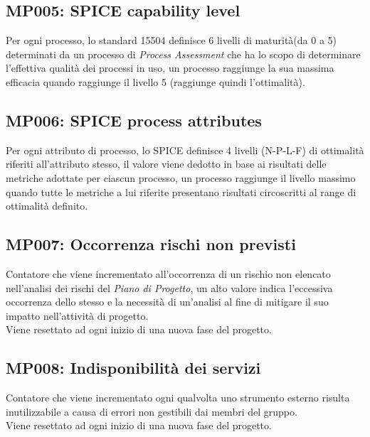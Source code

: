 \subsection{MP005: SPICE capability level}
Per ogni processo, lo standard 15504 definisce 6 livelli di maturità(da 0 a 5) determinati da un processo di  \textit{Process Assessment} che ha lo scopo di determinare l'effettiva qualità dei processi in uso, un processo raggiunge la sua massima efficacia quando raggiunge il livello 5 (raggiunge quindi l'ottimalità).

\subsection{MP006: SPICE process attributes}
Per ogni attributo di processo, lo SPICE definisce 4 livelli (N-P-L-F) di ottimalità riferiti all'attributo stesso, il valore viene dedotto in base ai risultati delle metriche adottate per ciascun processo, un processo raggiunge il livello massimo quando tutte le metriche a lui riferite presentano risultati circoscritti al range di ottimalità definito.

\subsection{MP007: Occorrenza rischi non previsti}
Contatore che viene incrementato all'occorrenza di un rischio non elencato nell'analisi dei rischi del \textit{Piano di Progetto}, un alto valore indica l'eccessiva occorrenza dello stesso e la necessità di un'analisi al fine di mitigare il suo impatto nell'attività di progetto.\\
Viene resettato ad ogni inizio di una nuova fase del progetto.

\subsection{MP008: Indisponibilità dei servizi}
Contatore che viene incrementato ogni qualvolta uno strumento esterno risulta inutilizzabile a causa di errori non gestibili dai membri del gruppo.\\
Viene resettato ad ogni inizio di una nuova fase del progetto.

